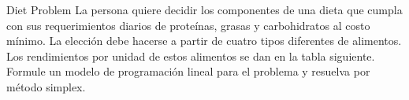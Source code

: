 \begin{frameExample}{Diet Problem}{}
  La persona quiere decidir los componentes de una dieta que cumpla con sus requerimientos diarios de proteínas, grasas y carbohidratos al costo mínimo. La elección debe hacerse a partir de cuatro tipos diferentes de alimentos. Los rendimientos por unidad de estos alimentos se dan en la tabla siguiente. Formule un modelo de programación lineal para el problema y resuelva por método simplex.


  {\centering
    \par}    
\end{frameExample}


